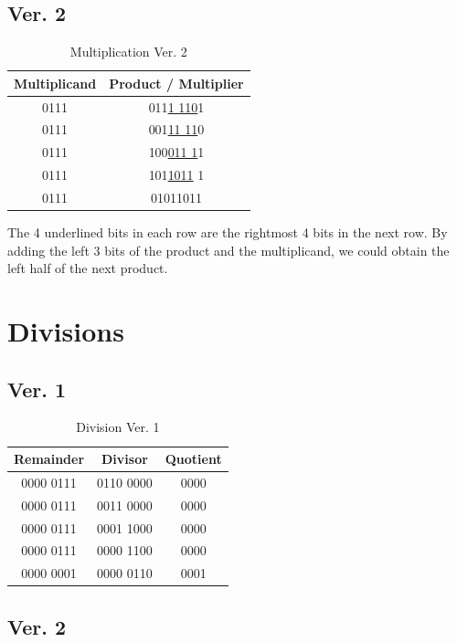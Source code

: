 \documentclass[12pt, a4paper]{article}
\begin{document}
\subsection{Ver. 2}

\begin{table}[htp]
\caption{Multiplication Ver. 2}
\label{tab:multiply2}
\centering
\begin{tabular}{cc}
\hline
Multiplicand & Product / Multiplier \\
\hline
0111 & 011\underline{1 110}1 \\
0111 & 001\underline{11 11}0 \\
0111 & 100\underline{011 1}1 \\
0111 & 101\underline{1011} 1 \\
0111 & 01011011 \\
\hline
\end{tabular}
\end{table}

The 4 underlined bits in each row are the rightmost 4 bits in the next row. By adding the left 3 bits of the product and the multiplicand, we could obtain the left half of the next product.

\section{Divisions}

\subsection{Ver. 1}

\begin{table}[H]
\caption{Division Ver. 1}
\label{tab:divide1}
\centering
\begin{tabular}{ccc}
\hline
Remainder & Divisor & Quotient \\
\hline
0000 0111 & 0110 0000 & 0000 \\
0000 0111 & 0011 0000 & 0000 \\
0000 0111 & 0001 1000 & 0000 \\
0000 0111 & 0000 1100 & 0000 \\
0000 0001 & 0000 0110 & 0001 \\
\hline
\end{tabular}
\end{table}

\subsection{Ver. 2}
\end{document}
